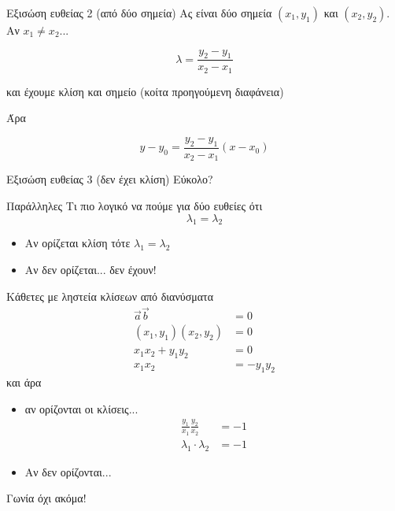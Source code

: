 \documentclass[greek]{beamer}
\begin{document}
\begin{frame}{Εξισώση ευθείας 2 (από δύο σημεία)}
  Ας είναι δύο σημεία $(x_1,y_1)$ και $(x_2,y_2)$. Αν $x_1\ne x_2$... \pause

  $$λ=\frac{y_2-y_1}{x_2-x_1}$$ \pause

  και έχουμε κλίση και σημείο (κοίτα προηγούμενη διαφάνεια) \pause

  Άρα

  $$y-y_0=\frac{y_2-y_1}{x_2-x_1}(x-x_0)$$
\end{frame}

\begin{frame}{Εξισώση ευθείας 3 (δεν έχει κλίση)}
  Εύκολο?
\end{frame}

\begin{frame}{Παράλληλες}
  Τι πιο λογικό να πούμε για δύο ευθείες ότι
  $$λ_1=λ_2$$
  \begin{itemize}[<+(2)->]
    \item Αν ορίζεται κλίση τότε $λ_1=λ_2$
    \item Αν δεν ορίζεται... δεν έχουν!
  \end{itemize}
\end{frame}

\begin{frame}{Κάθετες}
  με ληστεία κλίσεων από διανύσματα
  \begin{align*}
    \vec{a}\vec{b}     & =0       \\
    (x_1,y_1)(x_2,y_2) & =0       \\
    x_1x_2+y_1y_2      & =0       \\
    x_1x_2             & =-y_1y_2
  \end{align*}
  και άρα
  \begin{itemize}[<+(1)->]
    \item αν ορίζονται οι κλίσεις...
          \begin{align*}
            \frac{y_1}{x_1}\frac{y_2}{x_2} & =-1 \\
            λ_1\cdot λ_2                   & =-1
          \end{align*}
    \item Αν δεν ορίζονται...
  \end{itemize}

\end{frame}

\begin{frame}{Γωνία}
  όχι ακόμα!
\end{frame}
\end{document}
